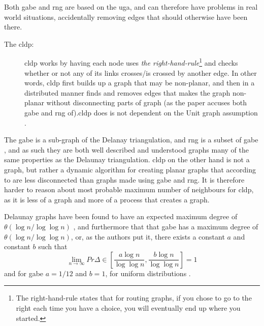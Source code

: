 Both \ac{gabe} and \ac{rng} are based on the \ac{uga}, and can therefore have problems in real world situations, accidentally removing edges that should otherwise have been there\cite{practical}.
\label{right-hand rule}
\begin{description}
\item[The \ac{cldp}:] \ac{cldp} works by having each node uses \emph{the right-hand-rule}\footnote{The right-hand-rule states that for routing graphs, if you chose to go to the right each time you have a choice, you will eventually end up where you started.} and checks whether or not any of its links crosses/is crossed by another edge. In other words, \ac{cldp} first builds up a graph that may be non-planar, and then in a distributed manner finds and removes edges that makes the graph non-planar without disconnecting parts of graph (as the paper accuses both \ac{gabe} and \ac{rng} of).\ac{cldp} does is not dependent on the Unit graph assumption \cite{practical}. 
\end{description}

The \ac{gabe} is a sub-graph of the Delanay triangulation, and \ac{rng} is a subset of \ac{gabe} , and as such they are both well described and understood graphs many of the same properties as the Delaunay triangulation. \ac{cldp} on the other hand is not a graph, but rather a dynamic algorithm for creating planar graphs that according to \cite{practical} are less disconnected than graphs made using \ac{gabe} and \ac{rng}. It is therefore harder to reason about most probable maximum number of neighbours for \ac{cldp}, as it is less of a graph and more of a process that creates a graph. 


Delaunay graphs have been found to have an expected maximum degree of $\theta(\log n / \log \log n)$ \cite{delExpected}, and furthermore that that \ac{gabe} has a maximum degree of $\theta(\log n / \log \log n)$, or, as the authors put it, there exists a constant $a$ and constant $b$ such that 
$$
\lim_{n \rightarrow \infty} Pr{\Delta \in [\frac{a\log n}{\log \log n}, \frac{b\log n}{\log \log n}]} = 1
$$
and for \ac{gabe} $a = 1/12$ and $b = 1$, for uniform distributions \cite{GGExpected}.

